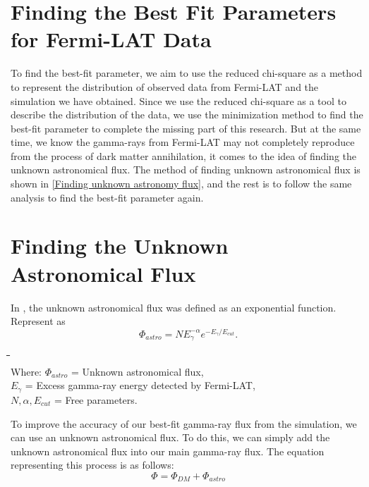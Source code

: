 \documentclass[10pt, oneside]{book}
\numberwithin{equation}{chapter}
\begin{document}
\section{Finding the Best Fit Parameters for Fermi-LAT Data} \label{Finding the Best Fit Parameters For Fermi-LAT Data}
To find the best-fit parameter, we aim to use the reduced chi-square as a method to represent the distribution of observed data from Fermi-LAT and the simulation we have obtained. Since we use the reduced chi-square as a tool to describe the distribution of the data, we use the minimization method to find the best-fit parameter to complete the missing part of this research. But at the same time, we know the gamma-rays from Fermi-LAT may not completely reproduce from the process of dark matter annihilation, it comes
to the idea of finding the unknown astronomical flux. The method of finding unknown astronomical flux is shown in \autoref{Finding unknown astronomy flux}, and the rest is to follow the same analysis to find the best-fit parameter again.

\section{Finding the Unknown Astronomical Flux}\label{Finding unknown astronomy flux}
In \cite{Folgado_2018}, the unknown astronomical flux was defined as an exponential function. Represent as
\begin{equation}
    \Phi_{astro} = NE_\gamma^{-\alpha}e^{-E_\gamma/E_{cut}}.
    \label{unknown astronomy flux equation}
\end{equation}
\begin{tabbing}
    \indent\= \indent\= \indent\= \indent\= \indent\= \indent\= \\
    Where:
    \>\>\> $\Phi_{astro}$ \>\>\> = Unknown astronomical flux,\\
    \>\>\> $E_\gamma$ \>\>\> = Excess gamma-ray energy detected by Fermi-LAT,\\
    \>\>\> $N, \alpha, E_{cut}$ \>\>\> = Free parameters.
\end{tabbing}
To improve the accuracy of our best-fit gamma-ray flux from the simulation, we can use an unknown astronomical flux. To do this, we can simply add the unknown astronomical flux into our main gamma-ray flux. The equation representing this process is as follows:
\begin{equation}
    \Phi = \Phi_{DM} + \Phi_{astro}
\end{equation}
\end{document}

